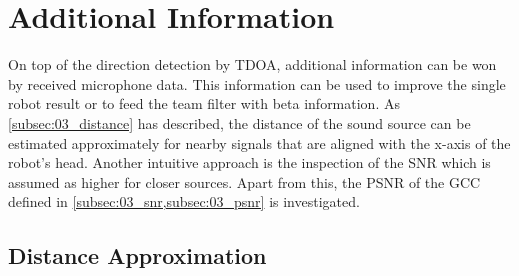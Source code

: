 \newpage
\section{Additional Information}
\label{sec:04_additionalInformation}

On top of the direction detection by \ac{TDOA}, additional information
can be won by received microphone data.
This information can be used to improve the single robot result or
to feed the team filter with beta information.
As \cref{subsec:03_distance} has described, the distance of the sound source
can be estimated approximately for nearby signals that are aligned with
the x-axis of the robot's head.
Another intuitive approach is the inspection of the \ac{SNR} which
is assumed as higher for closer sources.
Apart from this, the \ac{PSNR} of the \ac{GCC} defined in \cref{subsec:03_snr,subsec:03_psnr}
is investigated.

\subsection{Distance Approximation}
\label{subsec:04_distance}


